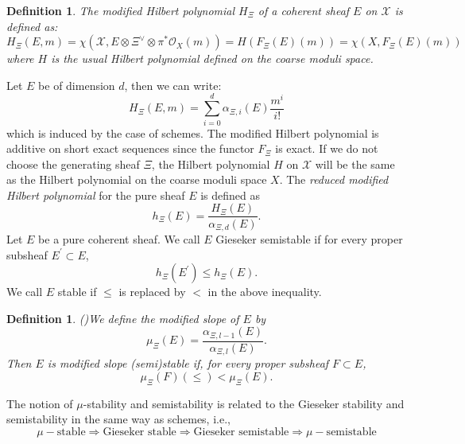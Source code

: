 \documentclass[10pt]{amsart}
\newtheorem{defn}[prop]{Definition}
\newcommand{\sO}{{\mathcal O}}
\newcommand{\sX}{{\mathcal X}}
\newcommand{\rk}{\mathop{\rm rk}}
\numberwithin{equation}{subsection}
\begin{document}
\begin{defn}\label{defn_Gieseker}
The modified Hilbert polynomial $H_{\Xi}$ of a coherent sheaf $E$ on $\sX$ is defined as:
$$H_{\Xi}(E,m)=\chi(\sX, E\otimes\Xi^{\vee}\otimes \pi^*\sO_{X}(m))
=H(F_{\Xi}(E)(m))=\chi(X, F_{\Xi}(E)(m))$$ where $H$ is the usual Hilbert polynomial defined on the coarse moduli space.
\end{defn}

Let $E$ be of dimension $d$, then we can write:
$$H_{\Xi}(E,m)=\sum_{i=0}^{d}\alpha_{\Xi, i}(E)\frac{m^i}{i!}$$
which is induced by the case of schemes. The modified Hilbert polynomial is additive on short exact sequences since the functor $F_{\Xi}$ is exact. If we do not choose the generating sheaf $\Xi$, the Hilbert polynomial $H$ on $\sX$ will be the same as the Hilbert polynomial on the coarse moduli space $X$.  
The {\em reduced modified Hilbert polynomial} for the pure sheaf $E$ is defined as 
$$h_{\Xi}(E)=\frac{H_{\Xi}(E)}{\alpha_{\Xi, d}(E)}.$$
Let $E$ be a pure coherent sheaf.  We call $E$ Gieseker semistable if for every proper subsheaf $E^\prime\subset E$, 
$$h_{\Xi}(E^\prime)\leq h_{\Xi}(E).$$
We call $E$ stable if $\leq$ is replaced by $<$ in the above inequality.


\begin{defn}(\cite{Nir})\label{defn_modified_slope_stability}
 We define the modified slope of  $E$ by 
 $$\mu_{\Xi}(E)=\frac{\alpha_{\Xi, l-1}(E)}{\alpha_{\Xi, l}(E)}.$$
 Then $E$ is
modified slope (semi)stable if, for every proper subsheaf $F\subset E$, 
$$\mu_{\Xi}(F)(\leq) < \mu_{\Xi}(E).$$
\end{defn}
The notion of $\mu$-stability and semistability is related to the Gieseker stability and semistability in the same way as schemes, i.e.,
$$\mu-\text{stable}\Rightarrow \text{Gieseker stable}\Rightarrow \text{Gieseker semistable}\Rightarrow \mu-\text{semistable}$$
\end{document}
